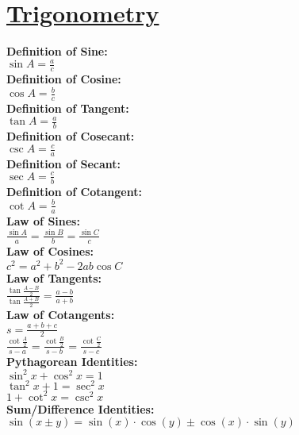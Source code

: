 \documentclass[12pt]{article}
\begin{document}
\section*{\underline{Trigonometry}}
\textbf{Definition of Sine:}
    \\ \( \sin A = \displaystyle\frac{ a }{ c } \)
\\ \textbf{Definition of Cosine:}
    \\ \( \cos A = \displaystyle\frac{ b }{ c } \)
\\ \textbf{Definition of Tangent:}
    \\ \( \tan A = \displaystyle\frac{ a }{ b } \)
\\ \textbf{Definition of Cosecant:}
    \\ \( \csc A = \displaystyle\frac{ c }{ a } \)
\\ \textbf{Definition of Secant:}
    \\ \( \sec A = \displaystyle\frac{ c }{ b } \)
\\ \textbf{Definition of Cotangent:}
    \\ \( \cot A = \displaystyle\frac{ b }{ a } \)
\\ \textbf{Law of Sines:}
    \\ \( \displaystyle\frac{ \sin A }{ a } = \displaystyle\frac{ \sin B }{ b } = \displaystyle\frac{ \sin C }{ c } \)
\\ \textbf{Law of Cosines:}
    \\ \( c^2 = a^2 + b^2 - 2ab \cos C \)
\\ \textbf{Law of Tangents:}
    \\ \( \displaystyle\frac{ \tan \frac{ A - B }{ 2 } }{ \tan \frac{ A + B }{ 2 } } = \displaystyle\frac{ a - b }{ a + b } \)
\\ \textbf{Law of Cotangents:}
    \\ \( s = \displaystyle\frac{ a + b + c }{ 2 } \)
    \\ \( \displaystyle\frac{ \cot \frac{ A }{ 2 } }{ s - a } = \displaystyle\frac{ \cot \frac{ B }{ 2 } }{ s - b } = \displaystyle\frac{ \cot \frac{ C }{ 2 } }{ s - c } \)
\\ \textbf{Pythagorean Identities:}
    \\ \( \sin^2 x + \cos^2 x = 1 \)
    \\ \( \tan^2 x + 1 = \sec^2 x \)
    \\ \( 1 + \cot^2 x = \csc^2 x \)
\\ \textbf{Sum/Difference Identities:}
    \\ \( \sin( x \pm y ) = \sin( x ) \cdot \cos( y ) \pm \cos( x ) \cdot \sin( y ) \)
\end{document}
